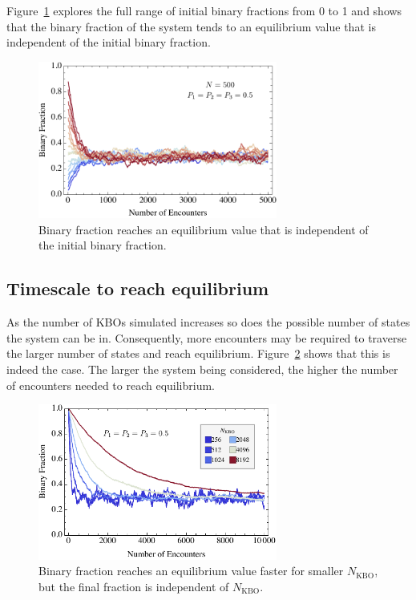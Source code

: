 \documentclass[a4paper,12pt]{article}
\begin{document}
Figure~\ref{fig:doesinitialstatematter} explores the full range of initial binary fractions from 0 to 1 and shows that the binary fraction of the system tends to an equilibrium value that is independent of the initial binary fraction.

\begin{figure}
\centering
\includegraphics[width=0.7\textwidth]{DoesInitialStateMatter}
\caption{\label{fig:doesinitialstatematter}
Binary fraction reaches an equilibrium value that is independent of the initial binary fraction.}
\end{figure}


\subsection{Timescale to reach equilibrium}
\label{sec:resultTimescaleForEquilibrium}

As the number of KBOs simulated increases so does the possible number of states the system can be in.  Consequently, more encounters may be required to traverse the larger number of states and reach equilibrium. Figure~\ref{fig:doespopulationsizematter} shows that this is indeed the case. The larger the system being considered, the higher the number of encounters needed to reach equilibrium.  

\begin{figure}
\centering
\includegraphics[width=0.7\textwidth]{DoesPopulationSizeMatter}
\caption{\label{fig:doespopulationsizematter}
Binary fraction reaches an equilibrium value faster for smaller $N_\text{KBO}$, but the final fraction is independent of $N_\text{KBO}$.}
\end{figure}
\end{document}
